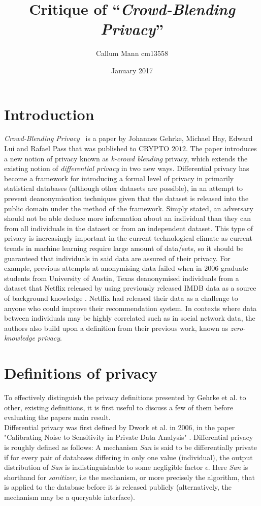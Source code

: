 \documentclass[12pt]{article}
\newcommand{\papername}{\emph{Crowd-Blending Privacy}}
\begin{document}
\title{Critique of ``\papername''}
\author{Callum Mann cm13558}
\date{January 2017}
\maketitle

\section{Introduction}
\papername~\cite{C:GHLP12} is a paper by Johannes Gehrke, Michael Hay,
Edward Lui and Rafael Pass that was published to CRYPTO $2012$.
The paper introduces a new notion of privacy known as \textit{k-crowd blending} privacy,
which extends the existing notion of \textit{differential privacy} in two new ways.
Differential privacy has become a framework for introducing a formal level of privacy in primarily
statistical databases (although other datasets are possible), in an attempt to prevent
deanonymisation techniques given that the dataset is released into the public domain
under the method of the framework. Simply stated, an adversary should not be able
deduce more information about an individual than they can from all individuals in the
dataset or from an independent dataset. This type of privacy is increasingly important
in the current technological climate as current trends in machine learning
require large amount of data/sets, so it should be guaranteed that individuals in said
data are assured of their privacy. For example, previous attempts at anonymising data
failed when in 2006 graduate students from University of Austin, Texas deanonymised individuals from
a dataset that Netflix released by using previously released IMDB data as a source of
background knowledge \cite{netflix}. Netflix had released their data as a challenge to anyone
who could improve their recommendation system. In contexts where data between
individuals may be highly correlated such as in social network data, the authors
also build upon a definition from their previous work, known as \textit{zero-knowledge privacy}.
\section{Definitions of privacy}
To effectively distinguish the privacy definitions presented by Gehrke et al. to other,
existing definitions, it is first useful to discuss a few of them before evaluating
the papers main result. \\

Differential privacy was first defined by Dwork et al. in 2006, in the paper
"Calibrating Noise to Sensitivity in Private Data Analysis" \cite{TCC:DMNS06}.
Differential privacy is roughly defined as follows: A mechanism \textit{San}
is said to be differentially private if for every pair of databases differing
in only one value (individual), the output distribution of \textit{San} is
indistinguishable to some negligible factor $\epsilon$. Here \textit{San} is shorthand
for \textit{sanitizer}, i.e the mechanism, or more precisely the algorithm, that is
 applied to the database before
it is released publicly (alternatively, the mechanism may be a queryable interface). \\
\end{document}
